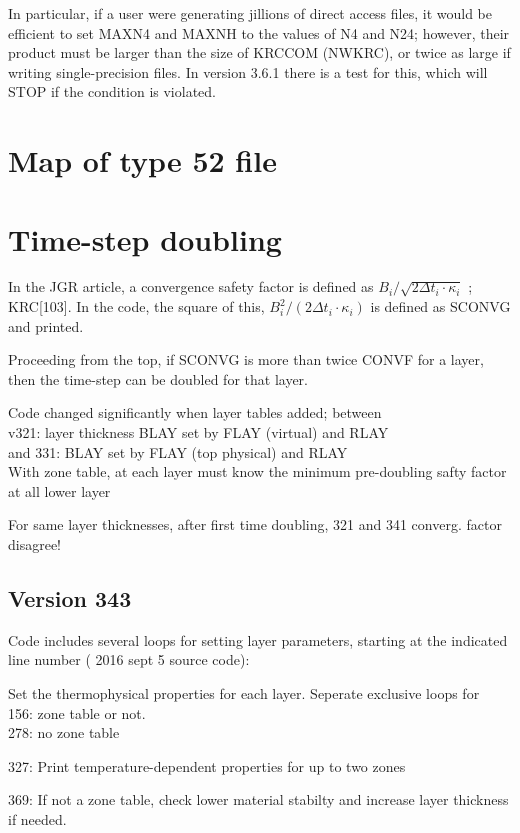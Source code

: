 \documentclass{article}
\newcommand{\qi}{\\ \hspace*{2.em}}      %
\begin{document}
In particular, if a user were generating jillions of direct access files, it
would be efficient to set MAXN4 and MAXNH to the values of N4 and N24; however,
their product must be larger than the size of KRCCOM (NWKRC), or twice as large
if writing single-precision files. In version 3.6.1 there is a test for this,
which will STOP if the condition is violated.

\appendix %

\section{Map of type 52 file \label{type52}}


\section{Time-step doubling}
In the JGR article, a convergence safety factor is defined as $ B_i / \sqrt{ 2
  \Delta t_i \cdot \kappa_i}$ ; KRC[103]. In the code, the square of this, 
 $B_i^2 / (2 \Delta t_i \cdot \kappa_i)$ is defined as SCONVG and printed.

Proceeding from the top, if SCONVG is more than twice CONVF for a layer, then
the time-step can be doubled for that layer.

Code changed significantly when layer tables added; between 
\qi v321: layer thickness BLAY set by FLAY (virtual) and RLAY 
\qi and 331: BLAY set by FLAY (top physical) and RLAY
\\ With zone table, at each layer must know the minimum pre-doubling safty factor at all lower layer

For same layer thicknesses, after first time doubling, 321 and 341
converg. factor disagree!

\subsection {Version 343}

Code includes several loops for setting layer parameters, starting at the
indicated line number ( 2016 sept 5 source code):

Set the thermophysical properties for each layer. Seperate exclusive loops for
\qi  156:  zone table or not.
\qi  278: no zone table

327: Print temperature-dependent properties for up to two zones 

369: If not a zone table, check lower material stabilty and increase layer
thickness if needed.
\end{document}
